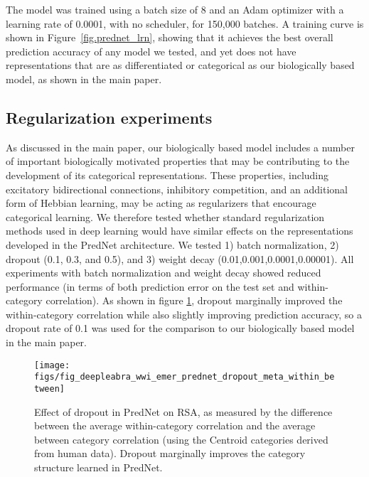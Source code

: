 The model was trained using a batch size of 8 and an Adam optimizer with a learning rate of 0.0001, with no scheduler, for 150,000 batches.  A training curve is shown in Figure~\ref{fig.prednet_lrn}, showing that it achieves the best overall prediction accuracy of any model we tested, and yet does not have representations that are as differentiated or categorical as our biologically based model, as shown in the main paper.

\subsection{Regularization experiments}

As discussed in the main paper, our biologically based model includes a number of important biologically motivated properties that may be contributing to the development of its categorical representations. These properties, including excitatory bidirectional connections, inhibitory competition, and an additional form of Hebbian learning, may be acting as regularizers that encourage categorical learning. We therefore tested whether standard regularization methods used in deep learning would have similar effects on the representations developed in the PredNet architecture. We tested 1) batch normalization, 2) dropout (0.1, 0.3, and 0.5), and 3) weight decay (0.01,0.001,0.0001,0.00001). All experiments with batch normalization and weight decay showed reduced performance (in terms of both prediction error on the test set and within-category correlation). As shown in figure \ref{fig.prednet_dropout_within_between}, dropout marginally improved the within-category correlation while also slightly improving prediction accuracy, so a dropout rate of 0.1 was used for the comparison to our biologically based model in the main paper. 

\begin{figure}
  \centering\texttt{[image: figs/fig\_deepleabra\_wwi\_emer\_prednet\_dropout\_meta\_within\_between]}
  \caption{\footnotesize Effect of dropout in PredNet on RSA, as measured by the difference between the average within-category correlation and the average between category correlation (using the Centroid categories derived from human data). Dropout marginally improves the category structure learned in PredNet.}
  \label{fig.prednet_dropout_within_between}
\end{figure}


